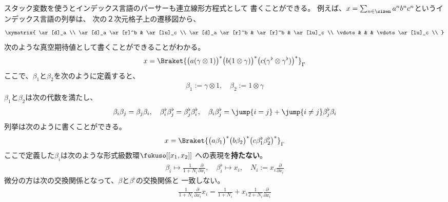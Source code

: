 {	\begin{todo}[インデックス言語]\label{todo:インデックス言語} %
		スタック変数を使うとインデックス言語のパーサーも連立線形方程式として
		書くことができる。
		例えば、$x=\sum_{n\in\sizen}a^nb^nc^n$というインデックス言語の列挙は、
		次の２次元格子上の遷移図から、
		\begin{equation*}\xymatrix{
			\ar[d]_a \\
			\ar[d]_a \ar[r]^b & \ar[lu]_c \\
			\ar[d]_a \ar[r]^b & \ar[r]^b & \ar[lu]_c \\
			\vdots & & & \vdots \ar[lu]_c \\
		}\end{equation*}
		次のような真空期待値として書くことができることがわかる。
		\begin{equation*}\begin{split}
			x = \Braket{\bigl(a(\gamma\otimes1)\bigr)^*
				\bigl(b(1\otimes\gamma)\bigr)^*
				\bigl(c(\gamma^\flat\otimes\gamma^\flat)\bigr)^*}_\Gamma
		\end{split}\end{equation*}
		ここで、$\beta_1$と$\beta_2$を次のように定義すると、
		\begin{equation*}\begin{split}
			\beta_1 := \gamma\otimes1,\quad \beta_2 := 1\otimes\gamma
		\end{split}\end{equation*}
		$\beta_1$と$\beta_2$は次の代数を満たし、
		\begin{equation*}\begin{split}
			\beta_i\beta_j = \beta_j\beta_i,\quad
			\beta_i^\flat\beta_j^\flat = \beta_j^\flat\beta_i^\flat,\quad
			\beta_i\beta_j^\flat = \jump{i=j} + \jump{i\neq j}\beta_j^\flat\beta_i
		\end{split}\end{equation*}
		列挙は次のように書くことができる。
		\begin{equation*}\begin{split}
			x = \Braket{\bigl(a\beta_1\bigr)^* \bigl(b\beta_2\bigr)^*
				\bigl(c\beta_1^\flat\beta_2^\flat\bigr)^*}_\Gamma
		\end{split}\end{equation*}
		ここで定義した$\beta_i$は次のような形式級数環$\fukuso[[x_1,x_2]]$
		への表現を{\bf{持たない}}。
		\begin{equation*}\begin{split}
			\beta_i \mapsto \frac{1}{1 + N_i}\frac{\partial}{\partial x_i}
			,\quad \beta_i^\flat \mapsto x_i
			,\quad N_i := x_i\frac{\partial}{\partial x_i}
		\end{split}\end{equation*}
		微分の方は次の交換関係となって、$\beta$と$\beta^\flat$の交換関係と
		一致しない。
		\begin{equation*}\begin{split}
			\frac{1}{1 + N_i}\frac{\partial}{\partial x_i}x_i
			= \frac{1}{1 + N_i} + 
			x_i\frac{1}{2 + N_i}\frac{\partial}{\partial x_i}
		\end{split}\end{equation*}
	\end{todo} %

}
